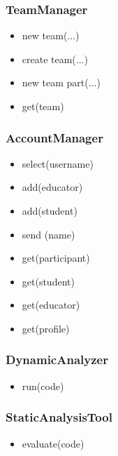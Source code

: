     \subsubsection{TeamManager}
    \begin{itemize}
        \item new team(...)
        \item create team(...)
        \item new team part(...)
        \item get(team)
    \end{itemize}
    
    \subsubsection{AccountManager}
    \begin{itemize}
        \item select(username)
        \item add(educator)
        \item add(student)
        \item send (name)
        \item get(participant)
        \item get(student)
        \item get(educator)
        \item get(profile)
    \end{itemize}
    
    \subsubsection{DynamicAnalyzer}
    \begin{itemize}
        \item run(code)
    \end{itemize}
    
    \subsubsection{StaticAnalysisTool}
    \begin{itemize}
        \item evaluate(code)
    \end{itemize}
    
